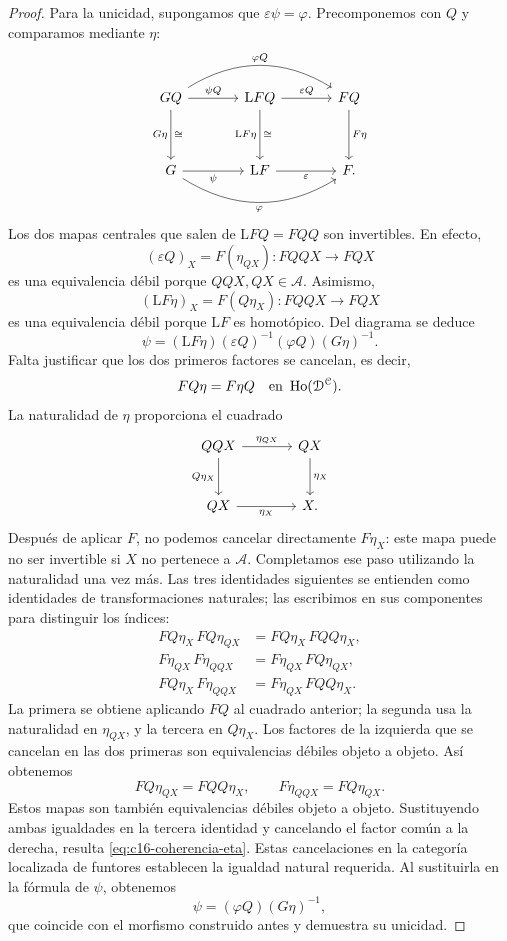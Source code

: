 \begin{proof}
Para la unicidad, supongamos que $\varepsilon\psi=\varphi$. Precomponemos con $Q$ y comparamos mediante $\eta$:
\[
\begin{tikzcd}[column sep=large,row sep=huge]
GQ\arrow[r,"\psi Q"]\arrow[rr,bend left=32,"\varphi Q"]
\arrow[d,"G\eta"',"\cong"]
&\mathrm LFQ\arrow[r,"\varepsilon Q"]\arrow[d,"\mathrm LF\eta"',"\cong"]
&FQ\arrow[d,"F\eta"]\\
G\arrow[r,"\psi"']\arrow[rr,bend right=32,"\varphi"']
&\mathrm LF\arrow[r,"\varepsilon"']&F.
\end{tikzcd}
\]
Los dos mapas centrales que salen de $\mathrm LFQ=FQQ$ son invertibles. En efecto,
\[
(\varepsilon Q)_X=F(\eta_{QX})\colon FQQX\longrightarrow FQX
\]
es una equivalencia débil porque $QQX,QX\in\mathcal A$. Asimismo,
\[
(\mathrm LF\eta)_X=F(Q\eta_X)\colon FQQX\longrightarrow FQX
\]
es una equivalencia débil porque $\mathrm LF$ es homotópico. Del diagrama se deduce
\[
\psi=(\mathrm LF\eta)(\varepsilon Q)^{-1}(\varphi Q)(G\eta)^{-1}.
\]
Falta justificar que los dos primeros factores se cancelan, es decir,
\begin{equation}\label{eq:c16-coherencia-eta}
FQ\eta=F\eta Q\quad\text{en }\operatorname{Ho}(\mathcal D^{\mathcal C}).
\end{equation}
La naturalidad de $\eta$ proporciona el cuadrado
\[
\begin{tikzcd}[column sep=large,row sep=large]
QQX\arrow[r,"\eta_{QX}"]\arrow[d,"Q\eta_X"']
&QX\arrow[d,"\eta_X"]\\
QX\arrow[r,"\eta_X"']&X.
\end{tikzcd}
\]
Después de aplicar $F$, no podemos cancelar directamente $F\eta_X$: este mapa puede no ser invertible si $X$ no pertenece a $\mathcal A$. Completamos ese paso utilizando la naturalidad una vez más. Las tres identidades siguientes se entienden como identidades de transformaciones naturales; las escribimos en sus componentes para distinguir los índices:
\[
\begin{aligned}
FQ\eta_X\,FQ\eta_{QX}
&=FQ\eta_X\,FQQ\eta_X,\\
F\eta_{QX}\,F\eta_{QQX}
&=F\eta_{QX}\,FQ\eta_{QX},\\
FQ\eta_X\,F\eta_{QQX}
&=F\eta_{QX}\,FQQ\eta_X.
\end{aligned}
\]
La primera se obtiene aplicando $FQ$ al cuadrado anterior; la segunda usa la naturalidad en $\eta_{QX}$, y la tercera en $Q\eta_X$. Los factores de la izquierda que se cancelan en las dos primeras son equivalencias débiles objeto a objeto. Así obtenemos
\[
FQ\eta_{QX}=FQQ\eta_X,
\qquad F\eta_{QQX}=FQ\eta_{QX}.
\]
Estos mapas son también equivalencias débiles objeto a objeto. Sustituyendo ambas igualdades en la tercera identidad y cancelando el factor común a la derecha, resulta \eqref{eq:c16-coherencia-eta}. Estas cancelaciones en la categoría localizada de funtores establecen la igualdad natural requerida. Al sustituirla en la fórmula de $\psi$, obtenemos
\[
\psi=(\varphi Q)(G\eta)^{-1},
\]
que coincide con el morfismo construido antes y demuestra su unicidad.
\end{proof}

